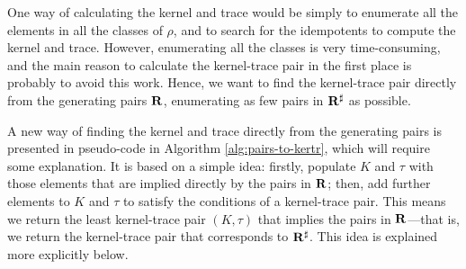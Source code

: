 One way of calculating the kernel and trace would be simply to enumerate all the
elements in all the classes of $\rho$, and to search for the idempotents to
compute the kernel and trace.  However, enumerating all the classes is very
time-consuming, and the main reason to calculate the kernel-trace pair in the
first place is probably to avoid this work.  Hence, we want to find the
kernel-trace pair directly from the generating pairs $\mathbf{R}$, enumerating
as few pairs in $\mathbf{R}^\sharp$ as possible.

A new way of finding the kernel and trace directly from the generating pairs is
presented in pseudo-code in Algorithm \ref{alg:pairs-to-kertr}, which will
require some explanation.  It is based on a simple idea: firstly, populate $K$
and $\tau$ with those elements that are implied directly by the pairs in
$\mathbf{R}$; then, add further elements to $K$ and $\tau$ to satisfy the
conditions of a kernel-trace pair.  This means we return the least kernel-trace
pair $(K, \tau)$ that implies the pairs in $\mathbf{R}$---that is, we return
the kernel-trace pair that corresponds to $\mathbf{R}^\sharp$.  This idea is
explained more explicitly below.

